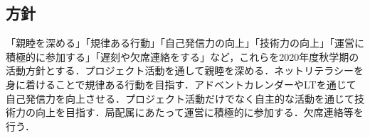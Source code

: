 \subsection*{\firstGrade{}方針}

「親睦を深める」「規律ある行動」「自己発信力の向上」「技術力の向上」「運営に積極的に参加する」「遅刻や欠席連絡をする」など，これらを{\firstGrade{}}2020年度秋学期の活動方針とする．プロジェクト活動を通して親睦を深める．ネットリテラシーを身に着けることで規律ある行動を目指す．アドベントカレンダーやLTを通じて自己発信力を向上させる．プロジェクト活動だけでなく自主的な活動を通じて技術力の向上を目指す．局配属にあたって運営に積極的に参加する．欠席連絡等を行う．
